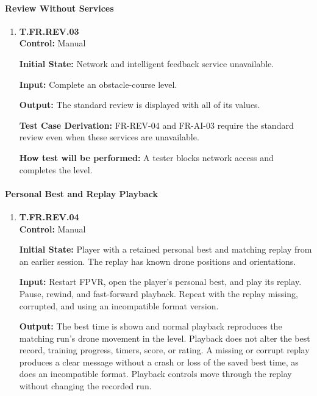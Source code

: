 \documentclass[12pt, titlepage]{article}
\begin{document}
{\begin{enumerate}
\end{enumerate}

\paragraph{Review Without Services}

\begin{enumerate}

\item{\hypertarget{test-fr-rev-03}{}\textbf{T.FR.REV.03}\\}
\textbf{Control:} Manual

\textbf{Initial State:} Network and intelligent feedback service unavailable.

\textbf{Input:} Complete an obstacle-course level.

\textbf{Output:} The standard review is displayed with all of its values.

\textbf{Test Case Derivation:} \mbox{FR-REV-04} and \mbox{FR-AI-03} require the standard
review even when these services are unavailable.

\textbf{How test will be performed:} A tester blocks network access and completes the
level.

\end{enumerate}

\paragraph{Personal Best and Replay Playback}

\begin{enumerate}

\item{\hypertarget{test-fr-rev-04}{}\textbf{T.FR.REV.04}\\}
\textbf{Control:} Manual

\textbf{Initial State:} Player with a retained personal best and matching replay
from an earlier session. The replay has known drone positions and orientations.

\textbf{Input:} Restart FPVR, open the player's personal best, and play its replay.
Pause, rewind, and fast-forward playback. Repeat with the replay missing, corrupted,
and using an incompatible format version.

\textbf{Output:} The best time is shown and normal playback reproduces the matching
run's drone movement in the level. Playback does not alter the best record, training
progress, timers, score, or rating. A missing or corrupt replay produces a clear
message without a crash or loss of the saved best time, as does an incompatible
format. Playback controls move through the replay without changing the recorded run.


\end{enumerate}}
\end{document}
